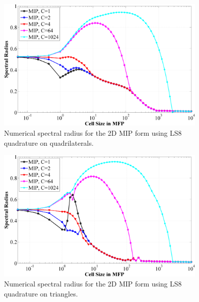 
\begin{figure}
\label{fig::2D_NSR_MIP_quads}
\centering
\includegraphics[width=0.9\textwidth]{figures/appendices/MIP_V_quad_LS8_C=1,2,4,64,1024.png}
\caption{Numerical spectral radius for the 2D MIP form using LS8 quadrature on quadrilaterals.}
\end{figure}

\begin{figure}
\label{fig::2D_NSR_MIP_triangles}
\centering
\includegraphics[width=0.9\textwidth]{figures/appendices/MIP_V_tri_LS8_C=1,2,4,64,1024.png}
\caption{Numerical spectral radius for the 2D MIP form using LS8 quadrature on triangles.}
\end{figure}

